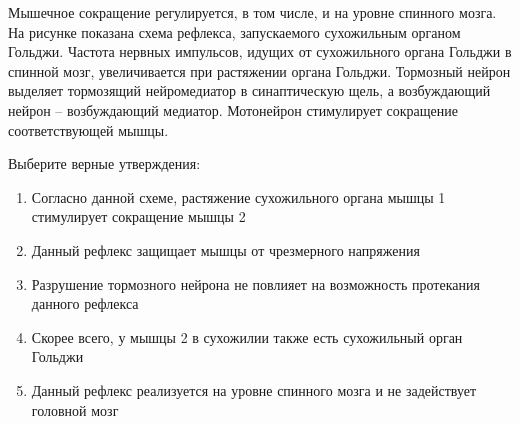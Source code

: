 
Мышечное
сокращение регулируется, в том числе, и на уровне спинного мозга. На рисунке
показана схема рефлекса, запускаемого сухожильным органом Гольджи. Частота
нервных импульсов, идущих от сухожильного органа Гольджи в спинной мозг,
увеличивается при растяжении органа Гольджи. Тормозный нейрон выделяет
тормозящий нейромедиатор в синаптическую щель, а возбуждающий нейрон –
возбуждающий медиатор. Мотонейрон стимулирует сокращение соответствующей мышцы.


Выберите
верные утверждения:

\begin{enumerate}
    \item Согласно данной схеме, растяжение сухожильного органа мышцы 1 стимулирует сокращение мышцы 2
    \item Данный рефлекс защищает мышцы от чрезмерного напряжения
    \item Разрушение тормозного нейрона не повлияет на возможность протекания данного рефлекса
    \item Скорее всего, у мышцы 2 в сухожилии также есть сухожильный орган Гольджи
    \item Данный рефлекс реализуется на уровне спинного мозга и не задействует головной мозг
\end{enumerate}

\explanationSection

